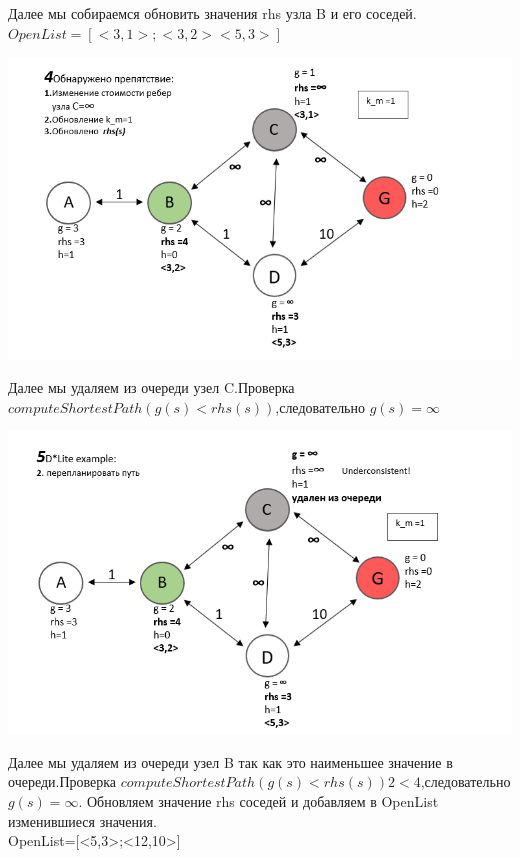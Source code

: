 \documentclass[12pt]{article}
\begin{document}
Далее мы собираемся обновить значения rhs узла B  и его соседей.\\$OpenList=[<3,1>;<3,2><5,3>]$
\begin{center}
         \includegraphics[width=1\textwidth]{img/example4_1.png}
    \end{center}
\newpage
Далее мы удаляем из очереди узел C.Проверка $computeShortestPath(g(s)<rhs(s))$,следовательно $g(s)=\infty$
\begin{center}
         \includegraphics[width=1\textwidth]{img/example5.png}
    \end{center}
Далее мы удаляем из очереди узел B так как это наименьшее значение в очереди.Проверка 
$computeShortestPath(g(s)<rhs(s)) 2 < 4$,следовательно $g(s)=\infty$. Обновляем значение rhs  соседей и добавляем в OpenList изменившиеся значения.\\OpenList=[<5,3>;<12,10>]
\end{document}
